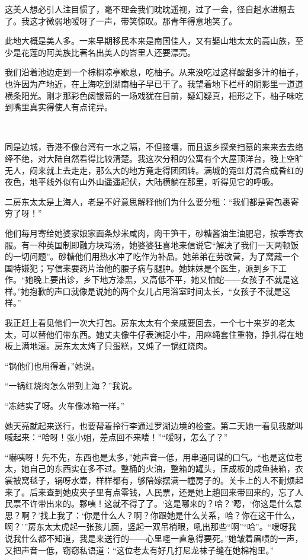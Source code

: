 \par 这美人想必引人注目惯了，毫不理会我们眈眈遥视，过了一会，径自趟水进棚去了。我这才微弱地嗳呀了一声，带笑惊叹。那青年得意地笑了。
\par 此地大概是美人多。一来早期移民本来是南国佳人，又有娶山地太太的高山族，至少是花莲的阿美族比著名出美人的峇里人还要漂亮。
\par 我们沿着池边走到一个棕榈凉亭歇息，吃柚子。从来没吃过这样酸甜多汁的柚子，也许因为产地近，在上海吃到湖南柚子早已干了。我望着地下栏杆的阴影里一道道横条阳光。刚才那彩色阔银幕的一场戏犹在目前，疑幻疑真，相形之下，柚子味吃到嘴里真实得使人有点诧异。
\par  
\par 同是边城，香港不像台湾有一水之隔，不但接壤，而且返乡探亲扫墓的来来去去络绎不绝，对大陆自然看得比较清楚。我这次分租的公寓有个大屋顶洋台，晚上空旷无人，闷来就上去走走，那么大的地方竟走得团团转。满城的霓虹灯混合成昏红的夜色，地平线外似有山外山遥遥起伏，大陆横躺在那里，听得见它的呼吸。
\par 二房东太太是上海人，老是不好意思解释他们为什么要分租：“我们都是寄包裹寄穷了呀！”
\par 他们每月寄给她婆家娘家面条炒米咸肉，肉干笋干，砂糖酱油生油肥皂，按季寄衣服。有一种英国制即融方块鸡汤，她婆婆狂喜地来信说它“解决了我们一天两顿饭的一切问题”。砂糖他们用热水冲了吃作为补品。她弟弟在劳改营，为了窝藏一个国特嫌犯；写信来要药片治他的腰子病与腿肿。她妹妹是个医生，派到乡下工作。“她晚上要出诊，乡下地方漆黑，又高低不平，她又怕蛇——女孩子不就是这样。”她抱歉的声口就像是说她的两个女儿占用浴室时间太长，“女孩子不就是这样。”
\par 我正赶上看见他们一次大打包。房东太太有个亲戚要回去，一个七十来岁的老太太，可以替他们带东西。她丈夫像牛仔表演捉小牛，用麻绳套住重物，挣扎得在地板上满地滚。房东太太烤了只蛋糕，又炖了一锅红烧肉。
\par “锅他们也用得着，”她说。
\par “一锅红烧肉怎么带到上海？”我说。
\par “冻结实了呀。火车像冰箱一样。”
\par 她天亮就起来送行，也要帮着拎行李通过罗湖边境的检查。第二天她一看见我就叫喊起来：“哈呀！张小姐，差点回不来喽！”“嗳呀，怎么了？”
\par “嚇咦呀！先不先，东西也是太多，”她声音一低，用串通同谋的口气。“也是这位老太，她自己的东西实在多不过。整桶的火油，整箱的罐头，压成板的咸鱼装箱，衣裳被窝毯子，锅呀水壶，样样都有，够陪嫁摆满一幢房子的。关卡上的人不耐烦起来了。后来查到她皮夹子里有点零钱，人民票，还是她上趟回来带回来的，忘了人民票不许带出来的。夥咦！这就不得了了。‘这是哪来的？哈？’嗯，‘你这是什么意思？啊？’找上我了：‘你是什么人？啊？你跟她是什么关系，哈？你在这干什么，啊？'”房东太太虎起一张孩儿面，竖起一双吊梢眼，吼出那些“啊”“哈”。“嗳呀我说我什么都不知道，我是来送行的——心里嚜一直急得要死。”她皱着眉啧的一声，又把声音一低，窃窃私语道：“这位老太有好几打尼龙袜子缝在她棉袍里。”
